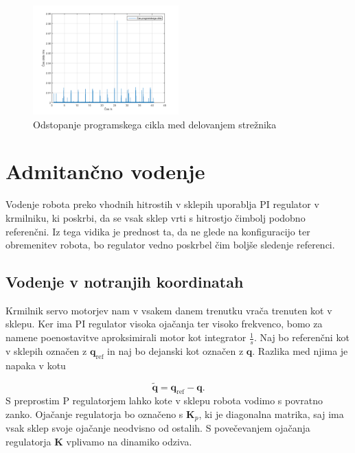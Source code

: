 \documentclass[a4paper]{article}
\begin{document}
\begin{figure}[!h]
	\centering
	\includegraphics[width=0.5\textwidth]{./slike/figure_jitter}
	\caption{Odstopanje programskega cikla med delovanjem strežnika}
	\label{fig:jittergraph}
	
\end{figure}

\section{Admitančno vodenje}

Vodenje robota preko vhodnih hitrostih v sklepih uporablja PI regulator v krmilniku, ki poskrbi, da se vsak sklep vrti s hitrostjo čimbolj podobno referenčni. Iz tega vidika je prednost ta, da ne glede na konfiguracijo ter obremenitev robota, bo regulator vedno poskrbel čim boljše sledenje referenci. 


\subsection{Vodenje v notranjih koordinatah} \label{sec:admit_inner}

Krmilnik servo motorjev nam v vsakem danem trenutku vrača trenuten kot v sklepu. Ker ima PI regulator visoka ojačanja ter visoko frekvenco, bomo za namene poenostavitve aproksimirali motor kot integrator $\frac{1}{s}$. Naj bo referenčni kot v sklepih označen z $\textbf{q}_{\mathrm{ref}}$ in naj bo dejanski kot označen z $\textbf{q}$. Razlika med njima je napaka v kotu 

\begin{equation}
\tilde{\textbf{q}} = \textbf{q}_{\mathrm{ref}} - \textbf{q}.
\end{equation}
S preprostim P regulatorjem lahko kote v sklepu robota vodimo s povratno zanko. Ojačanje regulatorja bo označe\-no s $\textbf{K}_p$, ki je diagonalna matrika, saj ima vsak sklep svoje ojačanje neodvisno od ostalih. S povečevanjem ojačanja regulatorja \textbf{K} vplivamo na dinamiko odziva.
\end{document}
